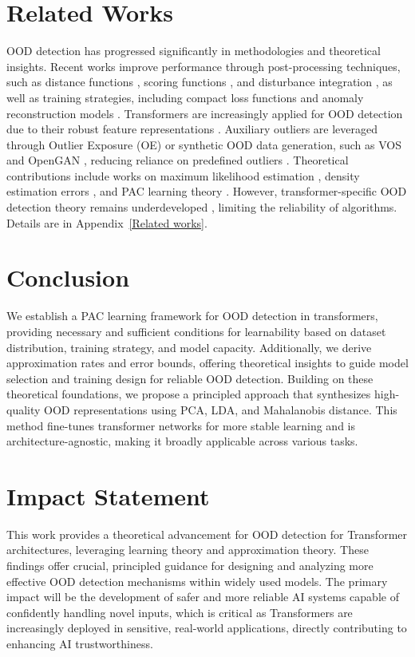 \documentclass{article}
\theoremstyle{plain}
\theoremstyle{definition}
\theoremstyle{remark}
\begin{document}
\section{Related Works}
OOD detection has progressed significantly in methodologies and theoretical insights. Recent works improve performance through post-processing techniques, such as distance functions \citep{denouden2018improving}, scoring functions \citep{ming2022delving}, and disturbance integration \citep{hsu2020generalized}, as well as training strategies, including compact loss functions \citep{tao2023non} and anomaly reconstruction models \citep{graham2023denoising, jiang2023read}. Transformers are increasingly applied for OOD detection due to their robust feature representations \citep{koner2021oodformer, fort2021exploring}. Auxiliary outliers are leveraged through Outlier Exposure (OE) \citep{hendrycks2018deep, zhu2023diversified} or synthetic OOD data generation, such as VOS \citep{du2022vos} and OpenGAN \citep{kong2021opengan}, reducing reliance on predefined outliers \citep{wang2023out, zheng2023out}. Theoretical contributions include works on maximum likelihood estimation \citep{morteza2022provable}, density estimation errors \citep{zhang2021understanding}, and PAC learning theory \citep{fang2022out}. However, transformer-specific OOD detection theory remains underdeveloped \citep{yang2021generalized}, limiting the reliability of algorithms. Details are in Appendix~\ref{Related works}.

\section{Conclusion}
We establish a PAC learning framework for OOD detection in transformers, providing necessary and sufficient conditions for learnability based on dataset distribution, training strategy, and model capacity. Additionally, we derive approximation rates and error bounds, offering theoretical insights to guide model selection and training design for reliable OOD detection.
%
Building on these theoretical foundations, we propose a principled approach that synthesizes high-quality OOD representations using PCA, LDA, and Mahalanobis distance. This method fine-tunes transformer networks for more stable learning and is architecture-agnostic, making it broadly applicable across various tasks.



\section*{Impact Statement}
This work provides a theoretical advancement for OOD detection for Transformer architectures, leveraging learning theory and approximation theory. These findings offer crucial, principled guidance for designing and analyzing more effective OOD detection mechanisms within widely used models. The primary impact will be the development of safer and more reliable AI systems capable of confidently handling novel inputs, which is critical as Transformers are increasingly deployed in sensitive, real-world applications, directly contributing to enhancing AI trustworthiness.
\end{document}
